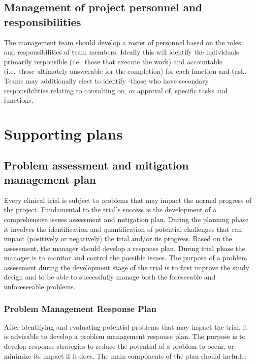 \documentclass[]{book}
\begin{document}
\subsection{Management of project personnel and
responsibilities}\label{management-of-project-personnel-and-responsibilities}

The management team should develop a roster of personnel based on the
roles and responsibilities of team members. Ideally this will identify
the individuals primarily responsible (i.e.~those that execute the work)
and accountable (i.e.~those ultimately answerable for the completion)
for each function and task. Teams may additionally elect to identify
-those who have secondary responsibilities relating to consulting on, or
approval of, specific tasks and functions.

\section{Supporting plans}\label{supporting-plans}

\subsection{Problem assessment and mitigation management
plan}\label{problem-assessment-and-mitigation-management-plan}

Every clinical trial is subject to problems that may impact the normal
progress of the project. Fundamental to the trial's success is the
development of a comprehensive issues assessment and mitigation plan.
During the planning phase it involves the identification and
quantification of potential challenges that can impact (positively or
negatively) the trial and/or its progress. Based on the assessment, the
manager should develop a response plan. During trial phase the manager
is to monitor and control the possible issues. The purpose of a problem
assessment during the development stage of the trial is to first improve
the study design and to be able to successfully manage both the
foreseeable and unforeseeable problems.

\subsubsection{Problem Management Response
Plan}\label{problem-management-response-plan}

After identifying and evaluating potential problems that may impact the
trial, it is advisable to develop a problem management response plan.
The purpose is to develop response strategies to reduce the potential of
a problem to occur, or minimize its impact if it does. The main
components of the plan should include:
\end{document}
